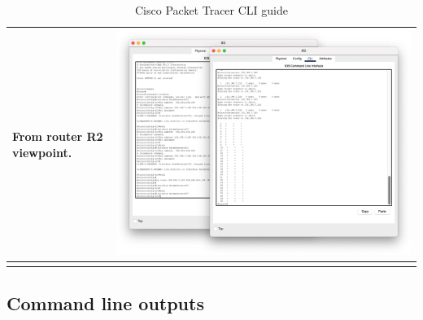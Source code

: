 \documentclass[11pt,a4paper]{report}
\begin{document}
\begin{flushleft}
\begin{center}
\begin{longtable}{ m{5cm} l }
                        From router R2 viewpoint.   & \includegraphics[scale=0.25 ,valign=c]{r2-cliall} \\ \hline

                        \caption{Cisco Packet Tracer CLI guide}
                        \label{tab:cptg2.5}
                    \end{longtable}
                \end{center}
        \end{flushleft}

    \subsection{Command line outputs}
        \lstset{style=termoutputs}
        

        

        \lstset{style=termoutputs}
        

        

        
\end{document}
